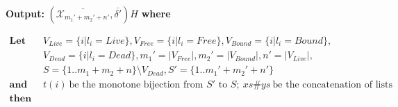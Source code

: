 \noindent
\textbf{Output:} $(\overline{\mathcal{X}_{m_1'+m_2'+n'}}, \overline{\delta'})H$ \textbf{where}

\hspace*{\parindent-1.7em}
$\begin{array}{ll}
\textbf{Let} \quad & V_{Live} = \{ i | l_i = Live \}, V_{Free} = \{ i | l_i = Free \}, V_{Bound} = \{ i | l_i = Bound \}, \\
& V_{Dead} = \{ i | l_i = Dead \}, m_1' = |V_{Free}|, m_2' = |V_{Bound}|, n' = |V_{Live}|, \\
& S = \{1..m_1+m_2+n\} \setminus V_{Dead}, S' = \{1..m_1'+m_2'+n'\} \\
\textbf{and} & t(i) \: \text{be the monotone bijection from $S'$ to $S$}; \: xs \# ys \: \text{be the concatenation of lists} \\
\textbf{then} & \\
\end{array}$\vspace{-1em}

\newcommand{\allvars}{\overline{\beta}\#\overline{\alpha}\#\overline{\gamma}}

